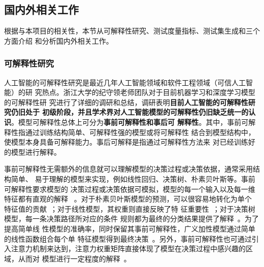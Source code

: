 \subsection{国内外相关工作}\label{relatedwork}


根据与本项目的相关性，本节从可解释性研究、测试度量指标、测试集生成和三个方面介绍
和分析国内外相关工作。

\subsubsection{可解释性研究}
{人工智能的可解释性研究是最近几年人工智能领域和软件工程领域（可信人工智能）的研
	究热点}。浙江大学的纪守领老师团队对于目前机器学习和深度学习模型的可解释性研
	究进行了详细的调研和总结，调研表明\textbf{目前人工智能的可解释性研究仍旧处于
	初级阶段，并且学术界对人工智能模型的可解释性仍旧缺乏统一的认
	识}。模型可解释性总体上可分为\textbf{事前可解释性和事后可
	解释性}。其中，事前可解释性指通过训练结构简单、可解释性强的模型或将可解释性
	结合到模型结构中，使模型本身具备可解释能力。事后可解释是指通过可解释性方法来
	对已经训练好的模型进行解释。

事前可解释性无需额外的信息就可以理解模型的决策过程或决策依据，通常采用结构简单、
易于理解的模型来实现，例如线性回归、决策树、朴素贝叶斯等。事前可解释性要求模型的
决策过程或决策依据可模拟，模型的每一个输入以及每一维特征都有直观的解释
~。对于朴素贝叶斯模型的预测，可以很容易地转化为单个
特征值的贡献~；对于线性模型，其权重则直接反映了特
征重要性~；对于决策树模型，每一条决策路径所对应的条件
规则都为最终的分类结果提供了解释~。为了提高简单线
性模型的准确率，同时保留其事前可解释性，广义加性模型通过简单的线性函数组合每个单
特征模型得到最终决策~。另外，事前可解释性也可通过引
入注意力机制来达到，注意力权重矩阵直接体现了模型在决策过程中感兴趣的区域，从而对
模型进行一定程度的解释~。

